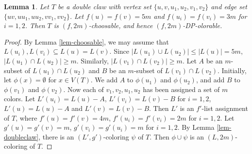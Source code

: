 \documentclass{article}
\newtheorem{lemma}{Lemma}
\begin{document}
    \begin{lemma}
        \label{lem-doublestar2}
         Let $T$ be a double claw with vertex set $\{u,v, u_1,u_2, v_1,v_2\}$ and edge set $\{uv,uu_1,uu_2, vv_1, vv_2\}$. 
    Let $f(u)=f(v)=5m$ and $f(u_i)=f(v_i)=3m$ for $i=1,2$. 
      Then $T$ is $(f,2m)$-choosable, and hence $(f,2m)$-DP-olorable. 
    \end{lemma}
    \begin{proof}
  By Lemma \ref{lem-choosable}, we may assume that $L(u_i), L(v_i) \subseteq L(u)=L(v)$. 
  Since $|L(u_1) \cup L(u_2)| \le |L(u)| = 5m$, $|L(u_1) \cap L(u_2)| \ge m$. Similarly, $|L(v_1) \cap L(v_2)| \ge m$.  
  Let $A$ be an $m$-subset of $L(u_1) \cap L(u_2)$ and $B$ be an $m$-subset of $L(v_1) \cap L(v_2)$. Initially, let $\phi(x) = \emptyset$ for $x \in V(T)$. We add $A$ to $\phi(u_1)$ and $\phi(u_2)$, and add $B$ to $\phi(v_1)$ and $\phi(v_2)$. Now each of $v_1,v_2,u_1,u_2$ has been assigned a set of $m$ colors. Let 
    $L'(u_i)=L(u) - A$, $L'(v_i) = L(v)-B$ for $i=1,2$, $L'(u)=L(u)-A$ and $L'(v)=L(v)-B$. Then $L'$ is an $f'$-list assignment of $T$, where $f'(u)=f'(v)=4m$, $f'(u_i)=f'(v_i)=2m$ for $i=1,2$. Let $g'(u)=g'(v)=m$, $g'(v_i) = g'(u_i) =m$ for $i=1,2$. By Lemma \ref{lem-doubleclaw}, there is an $(L', g')$-coloring $\psi$ of $T$. Then $\phi \cup \psi$ is  an $(L, 2m)$-coloring of $T$. 
\end{proof}
\end{document}
